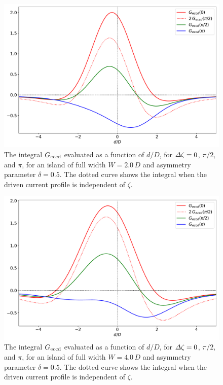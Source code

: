\documentclass[12pt,prb,aps]{revtex4-1}
\begin{document}
\begin{figure}
\centerline{\includegraphics[width=\textwidth]{W20.pdf}}
\caption{The integral $G_{\rm eccd}$ evaluated as a function of $d/D$, for ${\mit\Delta}\zeta = 0$, $\pi/2,$ and $\pi$, for an  island
of full width $W=2.0\,D$ and asymmetry parameter $\delta=0.5$. The dotted curve shows the integral when the driven current profile is independent of $\zeta$. \label{fig8}}
\end{figure}

\begin{figure}
\centerline{\includegraphics[width=\textwidth]{W40.pdf}}
\caption{The integral $G_{\rm eccd}$ evaluated as a function of $d/D$, for ${\mit\Delta}\zeta = 0$, $\pi/2,$ and $\pi$, for an  island
of full width $W=4.0\,D$ and asymmetry parameter $\delta=0.5$. The dotted curve shows the integral when the driven current profile is independent of $\zeta$.\label{fig9}}
\end{figure}
\end{document}
